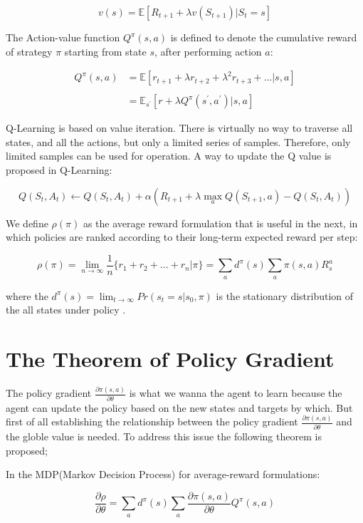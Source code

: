 \documentclass[letterpaper]{article} %
\begin{document}
$$v(s) = \mathbb E[R_{t+1} + \lambda v(S_{t+1})|S_t = s]$$

The Action-value function $Q^\pi(s,a)$ is defined to denote the cumulative reward of strategy $\pi$ starting from state $s$, after performing action $a$:

\begin{align}
Q^\pi(s,a) & =  \mathbb E[r_{t+1} + \lambda r_{t+2} +\lambda^2r_{t+3} + ... |s,a] \\\\& = \mathbb E_{s^\prime}[r+\lambda Q^\pi(s^\prime,a^\prime)|s,a]
\end{align}

Q-Learning is based on value iteration. There is virtually no way to traverse all states, and all the actions, but only a limited series of samples. Therefore, only limited samples can be used for operation. A way to update the Q value is proposed in Q-Learning:

$$Q(S_{t},A_{t}) \leftarrow Q(S_{t},A_{t})+\alpha({R_{t+1}+\lambda \max _aQ(S_{t+1},a)} - Q(S_t,A_t))$$

We define $\rho(\pi)$ as the average reward formulation that is useful in the next, in which policies are ranked according to their long-term expected reward per step:

$$\rho(\pi) = \lim_{n \rightarrow \infty} \frac{1}{n} \{r_1+r_2+...+r_n|\pi \}= \sum_{a}d^\pi(s) \sum_a \pi(s,a)R^a_s$$

where the $d^\pi(s)=\lim_{t \rightarrow \infty}Pr(s_t=s|s_0,\pi)$ is the stationary distribution of the all states under policy \pi.



\section{The Theorem of Policy Gradient}
The policy gradient $\frac{\partial \pi(s,a)}{\partial \theta}$ is what we wanna the agent to learn because the agent can update the policy based on the new states and targets by which. But first of all establishing the relationship between the policy gradient $\frac{\partial \pi(s,a)}{\partial \theta}$ and the globle value is needed. To address this issue the following theorem is proposed;

\begin{thm}
In the MDP(Markov Decision Process) for average-reward formulations:

$$\frac{\partial \rho}{\partial \theta} = \sum_{a}d^\pi(s) \sum_a \frac{\partial \pi(s,a)}{\partial \theta} Q^\pi(s,a)$$
\end{thm}
\end{document}
